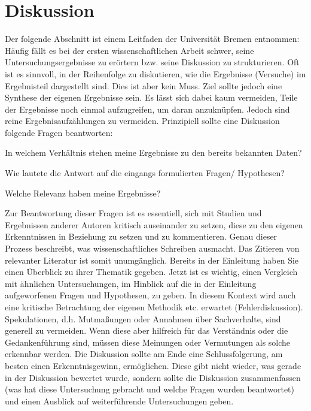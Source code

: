 
\chapter{Diskussion}
\label{chapter:diskussion}

Der folgende Abschnitt ist einem Leitfaden der Universität Bremen \cite{uni-bremen} entnommen:
Häufig fällt es bei der ersten wissenschaftlichen Arbeit schwer, seine Untersuchungsergebnisse zu erörtern bzw. seine Diskussion zu strukturieren. Oft ist es sinnvoll, in der Reihenfolge zu diskutieren, wie die Ergebnisse (Versuche) im Ergebnisteil dargestellt sind. Dies ist aber kein Muss. Ziel sollte jedoch eine Synthese der eigenen Ergebnisse sein. Es lässt sich dabei kaum vermeiden, Teile der Ergebnisse noch einmal aufzugreifen, um daran anzuknüpfen. Jedoch sind reine Ergebnisaufzählungen zu vermeiden. Prinzipiell sollte eine Diskussion folgende Fragen beantworten:

\begin{compactitem}
  \item In welchem Verhältnis stehen meine Ergebnisse zu den bereits bekannten Daten?
  \item Wie lautete die Antwort auf die eingangs formulierten Fragen/ Hypothesen?
  \item Welche Relevanz haben meine Ergebnisse?
\end{compactitem}

Zur Beantwortung dieser Fragen ist es essentiell, sich mit Studien und Ergebnissen anderer Autoren kritisch auseinander zu setzen, diese zu den eigenen Erkenntnissen in Beziehung zu setzen und zu kommentieren. Genau dieser Prozess beschreibt, was wissenschaftliches Schreiben ausmacht. Das Zitieren von relevanter Literatur ist somit unumgänglich. Bereits in der Einleitung haben Sie einen Überblick zu ihrer Thematik gegeben. Jetzt ist es wichtig, einen Vergleich mit ähnlichen Untersuchungen, im Hinblick auf die in der Einleitung aufgeworfenen Fragen und Hypothesen, zu geben. In diesem Kontext wird auch eine kritische Betrachtung der eigenen Methodik etc. erwartet (Fehlerdiskussion). Spekulationen, d.h. Mutmaßungen oder Annahmen über Sachverhalte, sind generell zu vermeiden. Wenn diese aber hilfreich für das Verständnis oder die Gedankenführung sind, müssen diese Meinungen oder Vermutungen als solche erkennbar werden.
Die Diskussion sollte am Ende eine Schlussfolgerung, am besten einen Erkenntnisgewinn, ermöglichen. Diese gibt nicht wieder, was gerade in der Diskussion bewertet wurde, sondern sollte die Diskussion zusammenfassen (was hat diese Untersuchung gebracht und welche Fragen wurden beantwortet) und einen Ausblick auf weiterführende Untersuchungen geben.

